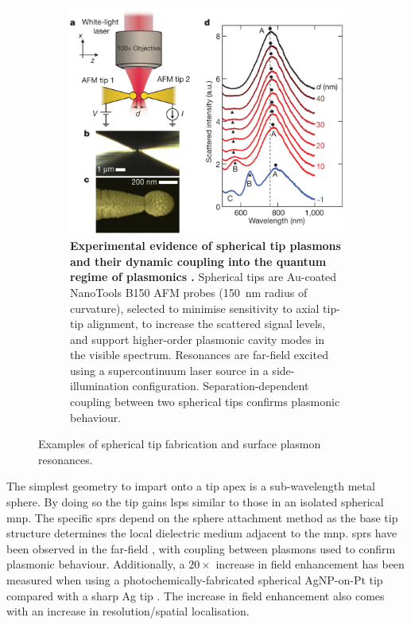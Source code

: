 \documentclass{article}
\begin{document}
\begin{figure}[bt]
\begin{subfigure}[t]{0.6\textwidth}
	\includegraphics[width=\textwidth, clip=true, trim=0 0 0 40]{figures/literature/nature11653-f1-2}
	\caption[Experimental evidence of spherical tip plasmons and their dynamic coupling into the quantum regime of plasmonics \cite{savage2012}]{\textbf{Experimental evidence of spherical tip plasmons and their dynamic coupling into the quantum regime of plasmonics \cite{savage2012}.} Spherical tips are Au-coated NanoTools B150 AFM probes (\SI{150}{nm} radius of curvature), selected to minimise sensitivity to axial tip-tip alignment, to increase the scattered signal levels, and support higher-order plasmonic cavity modes in the visible spectrum. Resonances are far-field excited using a supercontinuum laser source in a side-illumination configuration. Separation-dependent coupling between two spherical tips confirms plasmonic behaviour.}
\end{subfigure}
\caption{Examples of spherical tip fabrication and surface plasmon resonances.}
\label{fig:savage2012a}
\end{figure}

The simplest geometry to impart onto a tip apex is a sub-wavelength metal sphere. By doing so the tip gains \glspl{lsp} similar to those in an isolated spherical \gls{mnp}. The specific \glspl{spr} depend on the sphere attachment method as the base tip structure determines the local dielectric medium adjacent to the \gls{mnp}. \Glspl{spr} have been observed in the far-field \cite{savage2012}, with coupling between plasmons used to confirm plasmonic behaviour. Additionally, a $20\times$ increase in field enhancement has been measured when using a photochemically-fabricated spherical AgNP-on-Pt tip compared with a sharp Ag tip \cite{umakoshi2012}. The increase in field enhancement also comes with an increase in {\color{red}resolution/spatial localisation}.
\end{document}
